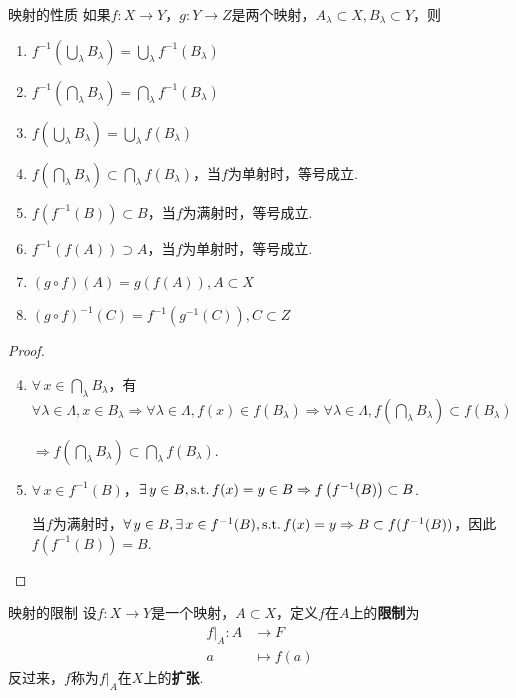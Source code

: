 \begin{proposition}{映射的性质}
    \wideline
    如果$f:X\to Y$，$g:Y\to Z$是两个映射，$A_\lambda\subset X,B_\lambda \subset Y$，则
    \begin{enumerate}
        \item $f^{-1}\left(\bigcup_{\lambda}{B_\lambda}\right)=\bigcup_{\lambda}{f^{-1}(B_\lambda)}$
        \item $f^{-1}\left(\bigcap_{\lambda}{B_\lambda}\right)=\bigcap_{\lambda}{f^{-1}(B_\lambda)}$
        \item $f\left(\bigcup_{\lambda}{B_\lambda}\right)=\bigcup_{\lambda}{f(B_\lambda)}$
        \item $f\left(\bigcap_{\lambda}{B_\lambda}\right)\subset\bigcap_{\lambda}{f(B_\lambda)}$，当$f$为单射时，等号成立.
        \item $f\left(f^{-1}(B)\right)\subset B$，当$f$为满射时，等号成立.
        \item $f^{-1}\left(f(A)\right)\supset A$，当$f$为单射时，等号成立.
        \item $(g\circ f)(A)=g \left(f(A)\right),A\subset X$
        \item $(g\circ f)^{-1}(C)=f^{-1}\left(g^{-1}(C)\right),C\subset Z$
    \end{enumerate}
\end{proposition}
\begin{proof}
    \begin{enumerate}
        \setcounter{enumi}{3}
        \item $\forall\, x\in \bigcap_{\lambda}{B_\lambda}$，有$\forall \lambda\in\Lambda,x\in B_{\lambda} \Rightarrow \forall \lambda\in\Lambda,f(x)\in f \left(B_\lambda\right) \Rightarrow \forall\lambda\in\Lambda,f\left(\bigcap_{\lambda}{B_\lambda}\right)\subset f(B_\lambda)$\par
        $ \Rightarrow f\left(\bigcap_{\lambda}{B_\lambda}\right)\subset\bigcap_{\lambda}{f(B_\lambda)}$.
        \item $\forall\, x\in f^{-1}(B)$，$\exists\, y\in B,\operatorname{\text{s.t.}} f(x)=y\in B \Rightarrow f\left(f^{-1}(B)\right)\subset B$.\par
        当$f$为满射时，$\forall\, y\in B,\exists\, x\in f^{-1}(B),\operatorname{\text{s.t.}} f(x)=y \Rightarrow B \subset f(f^{-1}(B))$，因此$f\left(f^{-1}(B)\right)= B$.
    \end{enumerate}
\end{proof}


\begin{definition}{映射的限制}
    设$f:X\to Y$是一个映射，$A\subset X$，定义$f$在$A$上的\textbf{限制}为
    \begin{align*}
        f|_A :A &\to F \\
        a &\mapsto f(a)
    \end{align*}
    反过来，$f$称为$f|_A$在$X$上的\textbf{扩张}.
\end{definition}

